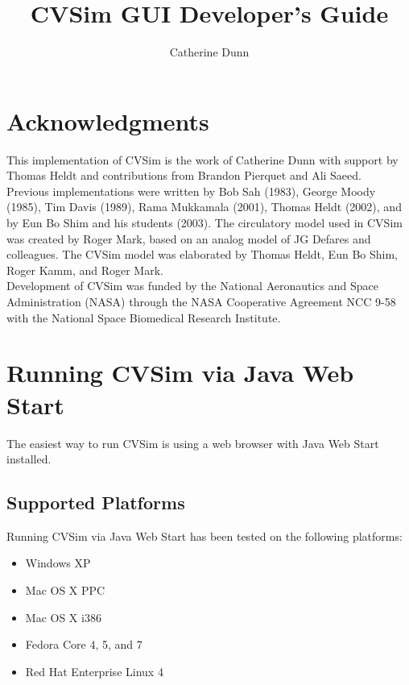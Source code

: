 \documentclass[12pt]{article}
\begin{document}
\title{CVSim GUI Developer's Guide}
\author{Catherine Dunn}
\maketitle



\section{Acknowledgments}

This implementation of CVSim is the work of Catherine Dunn with support
by Thomas Heldt and contributions from Brandon Pierquet and Ali Saeed. \\

\noindent Previous implementations were written by Bob Sah (1983), George Moody (1985),
Tim Davis (1989), Rama Mukkamala (2001), Thomas Heldt (2002), and by Eun Bo
Shim and his students (2003). The circulatory model used in CVSim was created
by Roger Mark, based on an analog model of JG Defares and colleagues. The CVSim
model was elaborated by Thomas Heldt, Eun Bo Shim, Roger Kamm, and Roger Mark.
\\

\noindent Development of CVSim was funded by the National Aeronautics and Space
Administration (NASA) through the NASA Cooperative Agreement NCC 9-58
with the National Space Biomedical Research Institute.



\section{Running CVSim via Java Web Start}

The easiest way to run CVSim is using a web browser with Java Web Start
installed.

\subsection{Supported Platforms}
Running CVSim via Java Web Start has been tested on the following
platforms:

\begin{itemize}
\item Windows XP
\item Mac OS X PPC
\item Mac OS X i386
\item Fedora Core 4, 5, and 7
\item Red Hat Enterprise Linux 4
\end{itemize}
\end{document}
